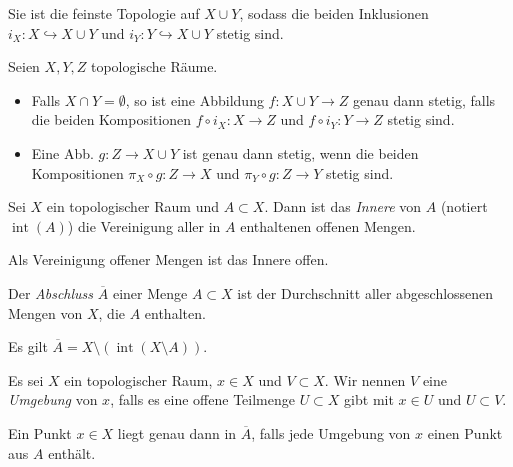 \documentclass{cheat-sheet}
\newcommand{\inte}{\mathop{\mathrm{int}}} %
\begin{document}
\begin{bem}
  Sie ist die feinste Topologie auf $X \cup Y$, sodass die beiden Inklusionen $i_X : X \hookrightarrow X \cup Y$ und $i_Y : Y \hookrightarrow X \cup Y$ stetig sind.
\end{bem}

\begin{prop}
  Seien $X, Y, Z$ topologische Räume.
  \begin{itemize}
    \item Falls $X \cap Y = \emptyset$, so ist eine Abbildung $f : X \cup Y \to Z$ genau dann stetig, falls die beiden Kompositionen $f \circ i_X : X \to Z$ und $f \circ i_Y : Y \to Z$ stetig sind.
    \item Eine Abb. $g : Z \to X \cup Y$ ist genau dann stetig, wenn die beiden Kompositionen $\pi_X \circ g : Z \to X$ und $\pi_Y \circ g : Z \to Y$ stetig sind.
  \end{itemize}
\end{prop}

\begin{defn}
  Sei $X$ ein topologischer Raum und $A \subset X$. Dann ist das \emph{Innere} von $A$ (notiert $\inte(A)$) die Vereinigung aller in $A$ enthaltenen offenen Mengen.
\end{defn}

\begin{bem}
  Als Vereinigung offener Mengen ist das Innere offen.
\end{bem}


\begin{defn}
  Der \emph{Abschluss} $\overline{A}$ einer Menge $A \subset X$ ist der Durchschnitt aller abgeschlossenen Mengen von $X$, die $A$ enthalten.
\end{defn}

\begin{bem}
  Es gilt $\overline{A} = X \setminus (\inte(X \setminus A))$.
\end{bem}

\begin{defn}
  Es sei $X$ ein topologischer Raum, $x \in X$ und $V \subset X$. Wir nennen $V$ eine \emph{Umgebung} von $x$, falls es eine offene Teilmenge $U \subset X$ gibt mit $x \in U$ und $U \subset V$.
\end{defn}

\begin{prop}
  Ein Punkt $x \in X$ liegt genau dann in $\overline{A}$, falls jede Umgebung von $x$ einen Punkt aus $A$ enthält.
\end{prop}
\end{document}
